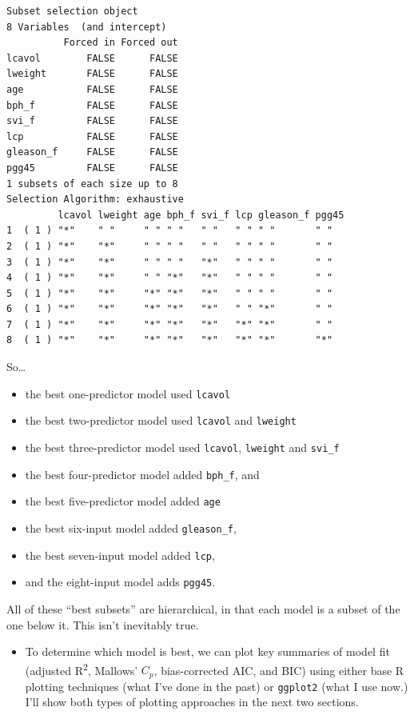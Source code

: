 \documentclass[]{book}
\providecommand{\tightlist}{%
  \setlength{\itemsep}{0pt}\setlength{\parskip}{0pt}}
\theoremstyle{definition}
\theoremstyle{definition}
\theoremstyle{definition}
\theoremstyle{remark}
\begin{document}
\begin{verbatim}
Subset selection object
8 Variables  (and intercept)
          Forced in Forced out
lcavol        FALSE      FALSE
lweight       FALSE      FALSE
age           FALSE      FALSE
bph_f         FALSE      FALSE
svi_f         FALSE      FALSE
lcp           FALSE      FALSE
gleason_f     FALSE      FALSE
pgg45         FALSE      FALSE
1 subsets of each size up to 8
Selection Algorithm: exhaustive
         lcavol lweight age bph_f svi_f lcp gleason_f pgg45
1  ( 1 ) "*"    " "     " " " "   " "   " " " "       " "  
2  ( 1 ) "*"    "*"     " " " "   " "   " " " "       " "  
3  ( 1 ) "*"    "*"     " " " "   "*"   " " " "       " "  
4  ( 1 ) "*"    "*"     " " "*"   "*"   " " " "       " "  
5  ( 1 ) "*"    "*"     "*" "*"   "*"   " " " "       " "  
6  ( 1 ) "*"    "*"     "*" "*"   "*"   " " "*"       " "  
7  ( 1 ) "*"    "*"     "*" "*"   "*"   "*" "*"       " "  
8  ( 1 ) "*"    "*"     "*" "*"   "*"   "*" "*"       "*"  
\end{verbatim}

So\ldots{}

\begin{itemize}
\tightlist
\item
  the best one-predictor model used \texttt{lcavol}
\item
  the best two-predictor model used \texttt{lcavol} and \texttt{lweight}
\item
  the best three-predictor model used \texttt{lcavol}, \texttt{lweight}
  and \texttt{svi\_f}
\item
  the best four-predictor model added \texttt{bph\_f}, and
\item
  the best five-predictor model added \texttt{age}
\item
  the best six-input model added \texttt{gleason\_f},
\item
  the best seven-input model added \texttt{lcp},
\item
  and the eight-input model adds \texttt{pgg45}.
\end{itemize}

All of these ``best subsets'' are hierarchical, in that each model is a
subset of the one below it. This isn't inevitably true.

\begin{itemize}
\tightlist
\item
  To determine which model is best, we can plot key summaries of model
  fit (adjusted R\textsuperscript{2}, Mallows' \(C_p\), bias-corrected
  AIC, and BIC) using either base R plotting techniques (what I've done
  in the past) or \texttt{ggplot2} (what I use now.) I'll show both
  types of plotting approaches in the next two sections.
\end{itemize}
\end{document}
